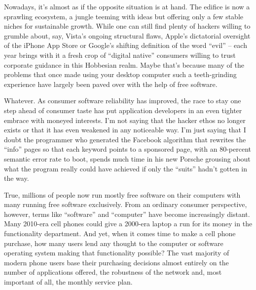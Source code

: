 \fi

\ifdefined\eng
Nowadays, it's almost as if the opposite situation is at hand. The
edifice is now a sprawling ecosystem, a jungle teeming with ideas but
offering only a few stable niches for sustainable growth. While one
can still find plenty of hackers willing to grumble about, say,
Vista's ongoing structural flaws, Apple's dictatorial oversight of the
iPhone App Store or Google's shifting definition of the word ``evil''
-- each year brings with it a fresh crop of ``digital native''
consumers willing to trust corporate guidance in this Hobbesian realm.
Maybe that's because many of the problems that once made using your
desktop computer such a teeth-grinding experience have largely been
paved over with the help of free software.
\fi

\ifdefined\chs

\fi

\ifdefined\eng
Whatever. As consumer software reliability has improved, the race to
stay one step ahead of consumer taste has put application developers
in an even tighter embrace with moneyed interests. I'm not saying that
the hacker ethos no longer exists or that it has even weakened in any
noticeable way. I'm just saying that I doubt the programmer who
generated the Facebook algorithm that rewrites the ``info'' pages so
that each keyword points to a sponsored page, with an 80-percent
semantic error rate to boot, spends much time in his new Porsche
grousing about what the program really could have achieved if only the
``suits'' hadn't gotten in the way.
\fi

\ifdefined\chs

\fi

\ifdefined\eng
True, millions of people now run mostly free software on their
computers with many running free software exclusively. From an
ordinary consumer perspective, however, terms like ``software'' and
``computer'' have become increasingly distant. Many 2010-era cell
phones could give a 2000-era laptop a run for its money in the
functionality department. And yet, when it comes time to make a cell
phone purchase, how many users lend any thought to the computer or
software operating system making that functionality possible? The vast
majority of modern phone users base their purchasing decisions almost
entirely on the number of applications offered, the robustness of the
network and, most important of all, the monthly service plan.
\fi

\ifdefined\chs

\fi


